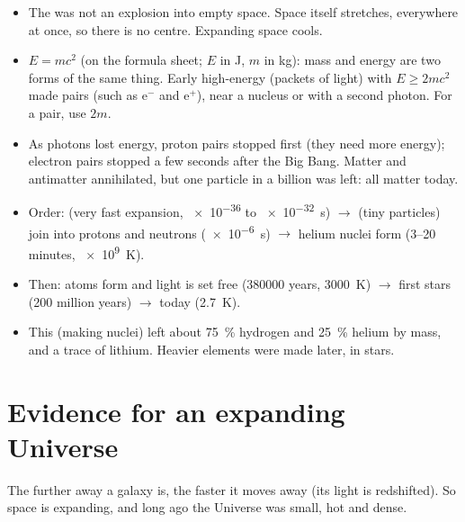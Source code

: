 \begin{itemize}
  \item The  was not an explosion into empty space. Space itself stretches,
        everywhere at once, so there is no centre. Expanding space cools.
  \item $E = mc^2$ (on the formula sheet; $E$ in J, $m$ in kg): mass and energy are two forms
        of the same thing. Early high-energy  (packets of light) with
        $E \geq 2mc^2$ made pairs (such as $\mathrm{e}^-$ and $\mathrm{e}^+$), near a nucleus or
        with a second photon. For a pair, use $2m$.
  \item As photons lost energy, proton pairs stopped first (they need more energy); electron
        pairs stopped a few seconds after the Big Bang. Matter and antimatter annihilated, but
        one particle in a billion was left: all matter today.
  \item Order:  (very fast expansion, \num{e-36} to \qty{e-32}{s}) $\to$
         (tiny particles) join into protons and neutrons (\qty{e-6}{s}) $\to$
        helium nuclei form (3--20 minutes, \qty{e9}{K}).
  \item Then: atoms form and light is set free (\num{380000} years, \qty{3000}{K}) $\to$
        first stars (200 million years) $\to$ today (\qty{2.7}{K}).
  \item This  (making nuclei) left about \qty{75}{\percent}
        hydrogen and \qty{25}{\percent} helium by mass, and a trace of lithium. Heavier
        elements were made later, in stars.
\end{itemize}

\section{Evidence for an expanding Universe}\label{ch1:sec:expansion}

\begin{bigidea}
The further away a galaxy is, the faster it moves away (its light is redshifted). So space is
expanding, and long ago the Universe was small, hot and dense.
\end{bigidea}

